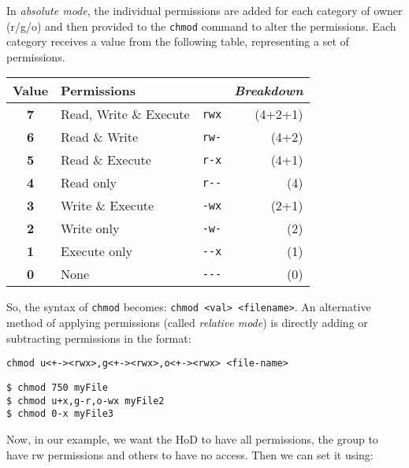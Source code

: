 \noindent
In \textit{absolute mode}, the individual permissions are added for each category of owner (r/g/o) and then provided to the \verb|chmod| command to alter the permissions. Each category receives a value from the following table, representing a set of permissions. 

\vspace{-10pt}
\begin{center}
	\begin{tabular}{clcr}
		\toprule
		\textbf{Value} &\textbf{Permissions} & &\textit{Breakdown} \\
		\midrule
		\textbf{7} &Read, Write \& Execute 	&\verb|rwx| &(4+2+1) \\
		\textbf{6} &Read \& Write 			&\verb|rw-| &(4+2) \\
		\textbf{5} &Read \& Execute 		&\verb|r-x| &(4+1) \\
		\textbf{4} &Read only 				&\verb|r--| &(4) \\
		\textbf{3} &Write \& Execute 		&\verb|-wx| &(2+1) \\
		\textbf{2} &Write only 				&\verb|-w-| &(2) \\
		\textbf{1} &Execute only 			&\verb|--x| &(1) \\
		\textbf{0} &None 					&\verb|---| &(0) \\
		\bottomrule
	\end{tabular}
\end{center}
\vspace{-10pt}

\noindent
So, the syntax of \verb|chmod| becomes: \verb|chmod <val> <filename>|. An alternative method of applying permissions (called \textit{relative mode}) is directly adding or subtracting permissions in the format:
\vspace{-15pt}
\begin{center}
	\verb|chmod u<+-><rwx>,g<+-><rwx>,o<+-><rwx> <file-name>|
\end{center}
\vspace{-10pt}

\vspace{-15pt}
\begin{verbatim}
$ chmod 750 myFile
$ chmod u+x,g-r,o-wx myFile2
$ chmod 0-x myFile3
\end{verbatim}
\vspace{-10pt}

\noindent
Now, in our example, we want the HoD to have all permissions, the group to have rw permissions and others to have no access. Then we can set it using:

